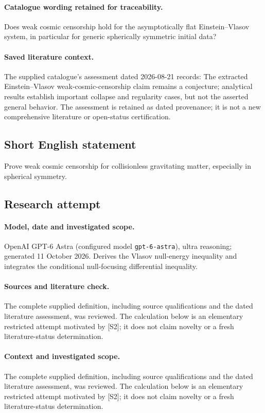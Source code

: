 \documentclass[11pt]{article}
\begin{document}
\paragraph{Catalogue wording retained for traceability.}
Does weak cosmic censorship hold for the asymptotically flat Einstein–Vlasov system, in particular for generic spherically symmetric initial data?

\paragraph{Saved literature context.} The supplied catalogue's assessment dated 2026-08-21 records: The extracted Einstein--Vlasov weak-cosmic-censorship claim remains a conjecture; analytical results establish important collapse and regularity cases, but not the asserted general behavior. The assessment is retained as dated provenance; it is not a new comprehensive literature or open-status certification.
\subsection{Short English statement}
Prove weak cosmic censorship for collisionless gravitating matter, especially in spherical symmetry.
\subsection{Research attempt}
\paragraph{Model, date and investigated scope.}
OpenAI GPT-6 Astra (configured model \texttt{gpt-6-astra}), ultra reasoning; generated 11 October 2026. Derives the Vlasov null-energy inequality and integrates the conditional null-focusing differential inequality.

\paragraph{Sources and literature check.}
The complete supplied definition, including source qualifications and the dated literature assessment, was reviewed. The calculation below is an elementary restricted attempt motivated by [S2]; it does not claim novelty or a fresh literature-status determination.

\paragraph{Context and investigated scope.} The complete supplied definition, including source qualifications and the dated literature assessment, was reviewed. The calculation below is an elementary restricted attempt motivated by [S2]; it does not claim novelty or a fresh literature-status determination.
\end{document}
